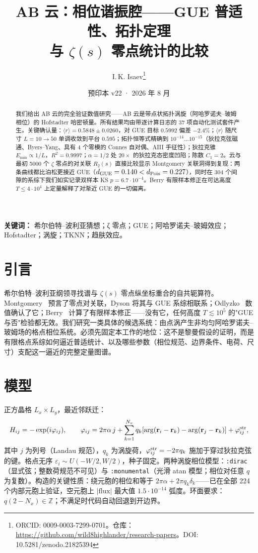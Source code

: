 \documentclass[11pt,a4paper]{ctexart}
\title{\bfseries AB 云：相位谐振腔——GUE 普适性、拓扑定理\\与 $\zeta(s)$ 零点统计的比较}
\author{I.\,K. Isaev\thanks{ORCID: 0009-0003-7299-0701。仓库：\url{https://github.com/wild8highlander/research-papers}。DOI: 10.5281/zenodo.21825394}}
\date{预印本 v22 · 2026 年 8 月}
\begin{document}
\maketitle

\begin{abstract}
我们给出 AB 云的完全验证数值研究——AB 云是带点状拓扑涡旋（阿哈罗诺夫–玻姆相位）的 Hofstadter 哈密顿量。所有结果均由带逐计算日志的 37 项自动化测试套件产生。关键确认量：$\langle r\rangle = 0.5848\pm0.0260$，对 GUE 目标 $0.5992$ 偏差 $-2.4\%$；$\langle r\rangle$ 随尺寸 $L=10\to50$ 单调收敛到平台 $0.595$；拓扑恒等式精确到 $10^{-14}\dots10^{-15}$（狄拉克弦磁通、Byers–Yang、具有 4 个零模的 Connes 自对偶、AIII 手征性）；狄拉克锥 $E_{\min}\propto1/L$，$R^2=0.9997$；$\alpha=1/2$ 处 $20\times$ 的狄拉克态密度凹陷；陈数 $C_1=2$。云与最初 5000 个 $\zeta$ 零点的对关联 $R_2(s)$ 直接比较显示 Montgomery 关联洞得到复现：两条曲线都比泊松更接近 GUE（$d_{\rm GUE}=0.140 < d_{\rm Pois}=0.227$），同时在 304 个间隙的系综下我们如实记录双样本 KS $p=6.7\cdot10^{-4}$。Berry 有限样本修正在可达高度 $T\le4\cdot10^4$ 上定量解释了对渐近 GUE 的一切偏离。
\end{abstract}

\noindent\textbf{关键词：} 希尔伯特–波利亚猜想；ζ 零点；GUE；阿哈罗诺夫–玻姆效应；Hofstadter；涡旋；TKNN；趋肤效应。

\section{引言}
希尔伯特–波利亚纲领寻找谱与 $\zeta(s)$ 零点纵坐标重合的自共轭算符。Montgomery~\cite{montgomery} 预言了零点对关联，Dyson 将其与 GUE 系综相联系；Odlyzko~\cite{odlyzko} 数值确认了它；Berry~\cite{berry} 计算了有限样本修正——没有它，任何高度 $T\lesssim10^5$ 的"GUE 与否"检验都无效。我们研究一类具体的候选系统：由点涡产生非均匀阿哈罗诺夫–玻姆场的格点相位系统。必须先固定本工作的地位：这不是黎曼假设的证明，而是有限格点系综如何逼近普适统计、以及哪些参数（相位规范、边界条件、电荷、尺寸）支配这一逼近的完整定量图谱。

\section{模型}
正方晶格 $L_x\times L_y$，最近邻跃迁：
\begin{equation}
H_{ij}=-\exp(i\varphi_{ij}),\qquad
\varphi_{ij}=2\pi\alpha\,j+\sum_{k=1}^{N_v}q_k\!\left[\arg(\mathbf r_i-\mathbf r_k)-\arg(\mathbf r_j-\mathbf r_k)\right]+\varphi^{\rm str}_{ij},
\end{equation}
其中 $j$ 为列号（Landau 规范），$q_k$ 为涡旋荷，$\varphi^{\rm str}_{ij}=-2\pi q_k$ 施加于穿过狄拉克弦的键。格点无序 $\varepsilon_i\sim U(-W/2,W/2)$，种子固定。两种涡旋相位模型：\texttt{:dirac}（显式弦；整数荷规范不可见）与 \texttt{:monumental}（光滑 atan 模型；相位对任意 $q$ 为复数）。构造的关键性质：绕元胞的相位和等于 $2\pi\alpha+2\pi q_k\delta_k$——已在全部 224 个内部元胞上验证，空元胞上 $|\mathrm{flux}|$ 最大值 $1.5\cdot10^{-14}$ 弧度。环面要求：$q(2-N_x)\in\mathbb Z$；不满足时代码自动回退到开边界。
\end{document}
